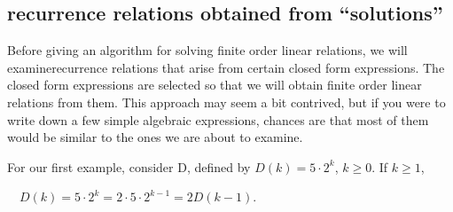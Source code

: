 \documentclass[10pt,]{book}
\theoremstyle{plain}
\theoremstyle{definition}
\theoremstyle{definition}
\theoremstyle{definition}
\theoremstyle{definition}
\numberwithin{equation}{section}
\begin{document}
\subsection[recurrence relations obtained from ``solutions'']{recurrence relations obtained from ``solutions''}\label{sss-recurrence-relations-obtained-from-solutions}
Before giving an algorithm for solving finite order linear relations, we will examinerecurrence relations that arise from certain closed form
expressions. The closed form expressions are selected so that we will obtain finite order linear relations from them. This approach
may seem a bit contrived, but if you were to write down a few simple algebraic expressions, chances are that most of them would be similar to the
ones we are about to examine.%
\par
For our first example, consider D, defined by \(D(k) =5\cdot 2^k\), \(k \geq  0\). If \(k \geq  1\),

\(\quad\)\(D(k) =5\cdot 2^k = 2\cdot 5\cdot 2^{k-1} = 2 D(k - 1)\).
\end{document}
